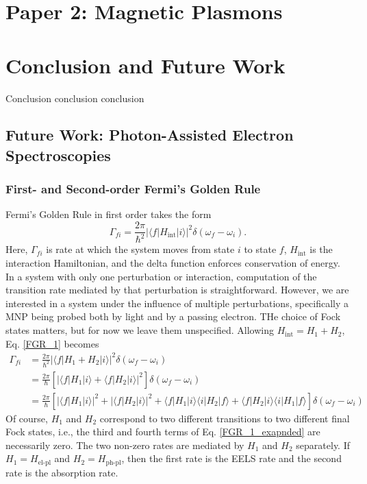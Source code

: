 \documentclass [11pt, proquest] {uwthesis}[2016/11/22]
\begin{document}
 
\chapter{Paper 2: Magnetic Plasmons}
 
 

\chapter{Conclusion and Future Work}

Conclusion conclusion conclusion

\section{Future Work: Photon-Assisted Electron Spectroscopies}

\subsection{First- and Second-order Fermi's Golden Rule}

Fermi's Golden Rule in first order takes the form
\begin{equation}
\Gamma_{fi} = \frac{2\pi}{\hbar^2}|\langle f |H_{\textrm{int}}| i \rangle |^2 \delta(\omega_f - \omega_i).
\label{FGR_1}
\end{equation}
Here, $\Gamma_{fi}$ is rate at which the system moves from state $i$ to state $f$, $H_{\textrm{int}}$ is the interaction Hamiltonian, and the delta function enforces conservation of energy. In a system with only one perturbation or interaction, computation of the transition rate mediated by that perturbation is straightforward. However, we are interested in a system under the influence of multiple perturbations, specifically a MNP being probed both by light and by a passing electron. THe choice of Fock states matters, but for now we leave them unspecified. Allowing $H_{\textrm{int}} = H_1 + H_2$, Eq. \ref{FGR_1} becomes
\begin{equation}
\begin{aligned}
\Gamma_{fi} &= \frac{2\pi}{\hbar^2}|\langle f |H_1 + H_2| i \rangle |^2 \delta(\omega_f - \omega_i)\\
&= \frac{2\pi}{\hbar}\left[|\langle f |H_1| i \rangle + \langle f |H_2| i \rangle |^2\right] \delta(\omega_f - \omega_i)\\
& = \frac{2\pi}{\hbar}\left[|\langle f|H_1|i \rangle|^2 + |\langle f|H_2|i \rangle|^2 + \langle f|H_1|i \rangle \langle i|H_2|f \rangle + \langle f|H_2|i \rangle \langle i|H_1|f \rangle\right]\delta(\omega_f - \omega_i)
\label{FGR_1_expanded}
\end{aligned}
\end{equation}
Of course, $H_1$ and $H_2$ correspond to two different transitions to two different final Fock states, i.e., the third and fourth terms of Eq. \ref{FGR_1_exapnded} are necessarily zero. The two non-zero rates are mediated by $H_1$ and $H_2$ separately. If $H_1 = H_\textrm{el-pl}$ and $H_2 = H_{\textrm{ph-pl}}$, then the first rate is the EELS rate and the second rate is the absorption rate.
\end{document}
